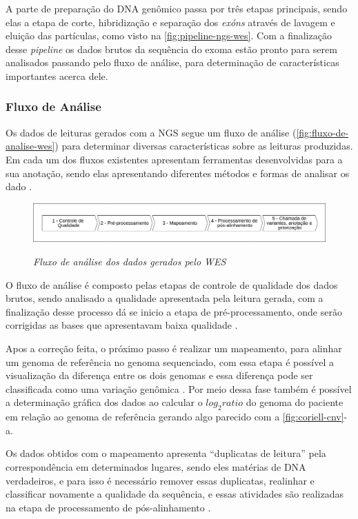 A parte de preparação do DNA genômico passa por três etapas principais, sendo elas a etapa de corte, hibridização e separação dos \textit{exóns} através de lavagem e eluição das partículas, como visto na \autoref{fig:pipeline-ngs-wes}. Com a finalização desse \textit{pipeline} os dados brutos da sequência do exoma estão pronto para serem analisados passando pelo fluxo de análise, para determinação de características importantes acerca dele.

\subsubsection{Fluxo de Análise}

Os dados de leituras gerados com a NGS segue um fluxo de análise (\autoref{fig:fluxo-de-analise-wes}) para determinar diversas características sobre as leituras produzidas. Em cada um dos fluxos existentes apresentam ferramentas desenvolvidas para a sua anotação, sendo elas apresentando diferentes métodos e formas de analisar os dado \cite{Bao2014}.

\begin{figure}[!htb]
\centering
\caption{\textit{Fluxo de análise dos dados gerados pelo WES}}
\includegraphics[width=1\textwidth]{./dados/figuras/fluxo-de-analise-wes}
\label{fig:fluxo-de-analise-wes}
\end{figure}

O fluxo de análise é composto pelas etapas de controle de qualidade dos dados brutos, sendo analisado a qualidade apresentada pela leitura gerada, com a finalização desse processo dá se inicio a etapa de pré-processamento, onde serão corrigidas as bases que apresentavam baixa qualidade \cite{Bao2014}.

Apos a correção feita, o próximo passo é realizar um mapeamento, para alinhar um genoma de referência no genoma sequenciado, com essa etapa é possível a visualização da diferença entre os dois genomas e essa diferença pode ser classificada como uma variação genômica \cite{Bao2014}. Por meio dessa fase também é possível a determinação gráfica dos dados ao calcular o $log_2 ratio$ do genoma do paciente em relação ao genoma de referência gerando algo parecido com a \autoref{fig:coriell-cnv}-a.

Os dados obtidos com o mapeamento apresenta ``duplicatas de leitura'' pela correspondência em determinados lugares, sendo eles matérias de DNA verdadeiros, e para isso é necessário remover essas duplicatas, realinhar e classificar novamente a qualidade da sequência, e essas atividades são realizadas na etapa de processamento de pós-alinhamento \cite{Bao2014}.

